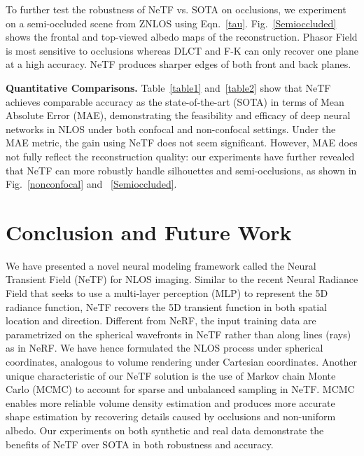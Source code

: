 \documentclass[10pt,journal,compsoc]{IEEEtran}
\begin{document}
To further test the robustness of NeTF vs. SOTA on occlusions, we experiment on a semi-occluded scene from ZNLOS using Eqn.~\ref{tau}. Fig.~\ref{Semioccluded} shows the frontal and top-viewed albedo maps of the reconstruction. Phasor Field is most sensitive to occlusions whereas DLCT and F-K can only recover one plane at a high accuracy. NeTF produces sharper edges of both front and back planes.

\textbf{Quantitative Comparisons.}
Table~\ref{table1} and~\ref{table2} show that NeTF achieves comparable accuracy as the state-of-the-art (SOTA) in terms of Mean Absolute Error (MAE), demonstrating the feasibility and efficacy of deep neural networks in NLOS under both confocal and non-confocal settings. Under the MAE metric, the gain using NeTF does not seem significant. However, MAE does not fully reflect the reconstruction quality: our experiments have further revealed that NeTF can more robustly handle silhouettes and semi-occlusions, as shown in Fig.~\ref{nonconfocal} and ~\ref{Semioccluded}.

\section{Conclusion and Future Work}
We have presented a novel neural modeling framework called the Neural Transient Field (NeTF) for NLOS imaging. Similar to the recent Neural Radiance Field that seeks to use a multi-layer perception (MLP) to represent the 5D radiance function, NeTF recovers the 5D transient function in both spatial location and direction. Different from NeRF, the input training data are parametrized on the spherical wavefronts in NeTF rather than along lines (rays) as in NeRF. We have hence formulated the NLOS process under spherical coordinates, analogous to volume rendering under Cartesian coordinates. Another unique characteristic of our NeTF solution is the use of Markov chain Monte Carlo (MCMC) to account for sparse and unbalanced sampling in NeTF. MCMC enables more reliable volume density estimation and produces more accurate shape estimation by recovering details caused by occlusions and non-uniform albedo. Our experiments on both synthetic and real data demonstrate the benefits of NeTF over SOTA in both robustness and accuracy. 
\end{document}
